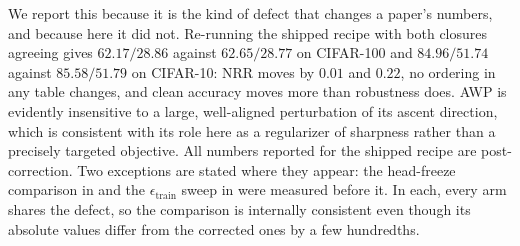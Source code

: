 We report this because it is the kind of defect that changes a paper's numbers, and because here it
did not. Re-running the shipped recipe with both closures agreeing gives $62.17/28.86$ against
$62.65/28.77$ on CIFAR-100 and $84.96/51.74$ against $85.58/51.79$ on CIFAR-10: NRR moves by $0.01$
and $0.22$, no ordering in any table changes, and clean accuracy moves more than robustness does. AWP
is evidently insensitive to a large, well-aligned perturbation of its ascent direction, which is
consistent with its role here as a regularizer of sharpness rather than a precisely targeted objective.
All numbers reported for the shipped recipe are post-correction. Two exceptions are stated where they
appear: the head-freeze comparison in  and the
$\epsilon_{\mathrm{train}}$ sweep in  were measured before it. In each, every arm
shares the defect, so the comparison is internally consistent even though its absolute values differ
from the corrected ones by a few hundredths.
